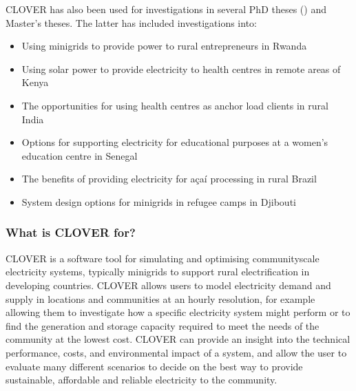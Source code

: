 \documentclass[letterpaper,10pt,english]{sphinxmanual}
\begin{document}
\sphinxAtStartPar
CLOVER has also been used for investigations in several PhD theses () and Master’s theses.
The latter has included investigations into:
\begin{itemize}
\item {} 
\sphinxAtStartPar
Using minigrids to provide power to rural entrepreneurs in Rwanda

\item {} 
\sphinxAtStartPar
Using solar power to provide electricity to health centres in remote areas of Kenya

\item {} 
\sphinxAtStartPar
The opportunities for using health centres as anchor load clients in rural India

\item {} 
\sphinxAtStartPar
Options for supporting electricity for educational purposes at a women’s education centre in Senegal

\item {} 
\sphinxAtStartPar
The benefits of providing electricity for açaí processing in rural Brazil

\item {} 
\sphinxAtStartPar
System design options for minigrids in refugee camps in Djibouti

\end{itemize}


\subsubsection{What is CLOVER for?}
\label{\detokenize{overview:what-is-clover-for}}
\sphinxAtStartPar
CLOVER is a software tool for simulating and optimising community\sphinxhyphen{}scale
electricity systems, typically minigrids to support rural
electrification in developing countries. CLOVER allows users to model
electricity demand and supply in locations and communities at an hourly
resolution, for example allowing them to investigate how a specific
electricity system might perform or to find the generation and storage
capacity required to meet the needs of the community at the lowest cost.
CLOVER can provide an insight into the technical performance, costs, and
environmental impact of a system, and allow the user to evaluate many
different scenarios to decide on the best way to provide sustainable,
affordable and reliable electricity to the community.
\end{document}
